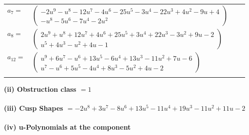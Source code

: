 \documentclass[1p]{elsarticle_modified}
\theoremstyle{definition}
\begin{document}
\begin{tabular}{m{7pt} m{180pt} m{7pt} m{180pt} }
\flushright $a_{7}=$&$\begin{pmatrix}-2 u^9- u^8-12 u^7-4 u^6-25 u^5-3 u^4-22 u^3+4 u^2-9 u+4\\- u^8-5 u^6-7 u^4-2 u^2\end{pmatrix}$ \\
\flushright $a_{8}=$&$\begin{pmatrix}2 u^9+u^8+12 u^7+4 u^6+25 u^5+3 u^4+22 u^3-3 u^2+9 u-2\\u^5+4 u^3- u^2+4 u-1\end{pmatrix}$ \\
\flushright $a_{12}=$&$\begin{pmatrix}u^9+6 u^7- u^6+13 u^5-6 u^4+13 u^3-11 u^2+7 u-6\\u^7- u^6+5 u^5-4 u^4+8 u^3-5 u^2+4 u-2\end{pmatrix}$\\&\end{tabular}
\flushleft \textbf{(ii) Obstruction class $= 1$}\\~\\
\flushleft \textbf{(iii) Cusp Shapes $= -2 u^8+3 u^7-8 u^6+13 u^5-11 u^4+19 u^3-11 u^2+11 u-2$}\\~\\
\newpage\renewcommand{\arraystretch}{1}
\flushleft \textbf{(iv) u-Polynomials at the component}\newline \\
\end{document}
